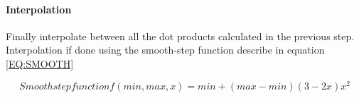 \paragraph{Interpolation}
Finally interpolate between all the dot products calculated in the previous step.
Interpolation if done using the smooth-step function describe in equation \ref{EQ:SMOOTH}

\begin{equation}[EQ:SMOOTH]{Smoothstep function}
\boxed{f(min, max, x) = min + (max - min)(3 - 2x)x^2}
\end{equation}
